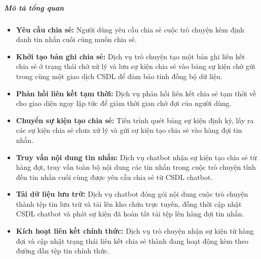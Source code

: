 \subparagraph{Mô tả tổng quan}

\begin{itemize}

\item \textbf{Yêu cầu chia sẻ:}
Người dùng yêu cầu
chia sẻ cuộc trò chuyện
kèm định danh tin nhắn cuối cùng muốn chia sẻ.

\item \textbf{Khởi tạo bản ghi chia sẻ:}
Dịch vụ trò chuyện
tạo một bản ghi liên kết chia sẻ
ở trạng thái chờ xử lý
và lưu sự kiện chia sẻ vào bảng sự kiện chờ gửi
trong cùng một giao dịch CSDL
để đảm bảo tính đồng bộ dữ liệu.

\item \textbf{Phản hồi liên kết tạm thời:}
Dịch vụ phản hồi liên kết chia sẻ tạm thời
về cho giao diện ngay lập tức
để giảm thời gian chờ đợi của người dùng.

\item \textbf{Chuyển sự kiện tạo chia sẻ:}
Tiến trình quét bảng sự kiện định kỳ,
lấy ra các sự kiện chia sẻ chưa xử lý
và gửi sự kiện tạo chia sẻ vào hàng đợi tin nhắn.

\item \textbf{Truy vấn nội dung tin nhắn:}
Dịch vụ chatbot nhận sự kiện tạo chia sẻ từ hàng đợi,
truy vấn toàn bộ nội dung các tin nhắn trong cuộc trò chuyện tính
đến tin nhắn cuối cùng được yêu cầu chia sẻ từ CSDL chatbot.

\item \textbf{Tải dữ liệu lưu trữ:}
Dịch vụ chatbot đóng gói nội dung
cuộc trò chuyện thành tệp tin lưu trữ
và tải lên kho chứa trực tuyến, đồng thời cập nhật CSDL chatbot
và phát sự kiện đã hoàn tất tải tệp lên hàng đợi tin nhắn.

\item \textbf{Kích hoạt liên kết chính thức:}
Dịch vụ trò chuyện nhận sự kiện từ hàng đợi
và cập nhật trạng thái liên kết chia sẻ
thành đang hoạt động kèm theo đường dẫn tệp tin chính thức.

\end{itemize}
